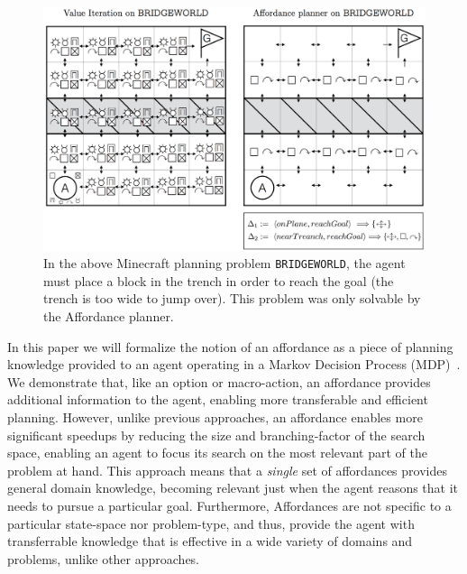 \documentclass[]{article}
\begin{document}
\begin{figure}
\centering
\includegraphics[scale = 0.21]{figures/bridgeworld_vi_vs_aff.png}
\caption{In the above Minecraft planning problem \texttt{BRIDGEWORLD}, the agent must place a block in the trench in order to reach the goal (the trench is too wide to jump over). This problem was only solvable by the Affordance planner.\label{fig:bridgeworld_aff}}
\end{figure}

In this paper we will formalize
the notion of an affordance as a piece of planning knowledge provided
to an agent operating in a Markov Decision Process
(MDP)~\citep{kaelbling99}.  We demonstrate that, like an option or
macro-action, an affordance provides additional information to the
agent, enabling more transferable and efficient planning.  However, unlike previous
approaches, an affordance enables more significant speedups by
reducing the size and branching-factor of the search space, enabling
an agent to focus its search on the most relevant part of the problem
at hand.  This approach means that a {\em single} set of affordances
provides general domain knowledge, becoming relevant just when the
agent reasons that it needs to pursue a particular goal.  Furthermore,
Affordances are not specific to a particular state-space nor problem-type, and thus, provide
the agent with transferrable knowledge that is effective in a wide variety of
domains and problems, unlike other approaches.
\end{document}
